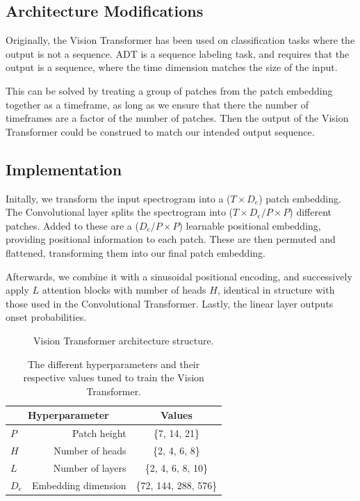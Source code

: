 \subsection{Architecture Modifications}

Originally, the Vision Transformer has been used on classification tasks where the output is not a sequence. \gls{ADT} is a sequence labeling task, and requires that the output is a sequence, where the time dimension matches the size of the input.

This can be solved by treating a group of patches from the patch embedding together as a timeframe, as long as we ensure that there the number of timeframes are a factor of the number of patches. Then the output of the Vision Transformer could be construed to match our intended output sequence.

\subsection{Implementation}

Initally, we transform the input spectrogram into a ($T \times D_e$) patch embedding. The Convolutional layer splits the spectrogram into ($T \times D_e / P \times P$) different patches. Added to these are a ($D_e / P \times P$) learnable positional embedding, providing positional information to each patch. These are then permuted and flattened, transforming them into our final patch embedding.

Afterwards, we combine it with a sinusoidal positional encoding, and successively apply $L$ attention blocks with number of heads $H$, identical in structure with those used in the Convolutional Transformer. Lastly, the linear layer outputs onset probabilities.

\begin{figure}[H]
    \hspace*{-0.5cm}
    \centering
    
    \caption{Vision Transformer architecture structure.}
    \label{ViTFigure}
\end{figure}

\begin{table}[H]
    \centering
    \begin{tabular}{lr|c}
        \multicolumn{2}{c|}{Hyperparameter} & Values       \\
        \hline
        $P$ & Patch height      & \{7, 14, 21\} \\
        $H$ & Number of heads     & \{2, 4, 6, 8\} \\
        $L$ & Number of layers      & \{2, 4, 6, 8, 10\} \\
        $D_e$ & Embedding dimension      & \{72, 144, 288, 576\} \\
    \end{tabular}
    \caption{The different hyperparameters and their respective values tuned to train the Vision Transformer.}
    \label{ViTHyperparams}
\end{table}
